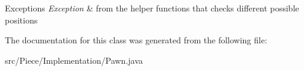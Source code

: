 \begin{DoxyExceptions}{Exceptions}
{\em Exception} & from the helper functions that checks different possible positions \\
\hline
\end{DoxyExceptions}


The documentation for this class was generated from the following file\-:\begin{DoxyCompactItemize}
\item 
src/\-Piece/\-Implementation/Pawn.\-java\end{DoxyCompactItemize}
